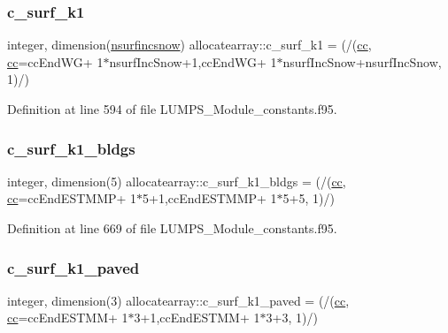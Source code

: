 \subsubsection{\texorpdfstring{c\+\_\+surf\+\_\+k1}{c\_surf\_k1}}
{\footnotesize\ttfamily integer, dimension(\hyperlink{namespaceallocatearray_af4d113f332b6759cfa22271140c9162d}{nsurfincsnow}) allocatearray\+::c\+\_\+surf\+\_\+k1 = (/(\hyperlink{namespaceallocatearray_ac863c81704eb507dee10f5e10741e10c}{cc}, \hyperlink{namespaceallocatearray_ac863c81704eb507dee10f5e10741e10c}{cc}=cc\+End\+WG+ 1$\ast$nsurf\+Inc\+Snow+1,cc\+End\+WG+ 1$\ast$nsurf\+Inc\+Snow+nsurf\+Inc\+Snow, 1)/)}



Definition at line 594 of file L\+U\+M\+P\+S\+\_\+\+Module\+\_\+constants.\+f95.

\mbox{\label{namespaceallocatearray_a24292d640a153248dd27a9d46e279457}} 
\subsubsection{\texorpdfstring{c\+\_\+surf\+\_\+k1\+\_\+bldgs}{c\_surf\_k1\_bldgs}}
{\footnotesize\ttfamily integer, dimension(5) allocatearray\+::c\+\_\+surf\+\_\+k1\+\_\+bldgs = (/(\hyperlink{namespaceallocatearray_ac863c81704eb507dee10f5e10741e10c}{cc}, \hyperlink{namespaceallocatearray_ac863c81704eb507dee10f5e10741e10c}{cc}=cc\+End\+E\+S\+T\+M\+MP+ 1$\ast$5+1,cc\+End\+E\+S\+T\+M\+MP+ 1$\ast$5+5, 1)/)}



Definition at line 669 of file L\+U\+M\+P\+S\+\_\+\+Module\+\_\+constants.\+f95.

\mbox{\label{namespaceallocatearray_a70f82bab4ca451d3736e29ea97681c8e}} 
\subsubsection{\texorpdfstring{c\+\_\+surf\+\_\+k1\+\_\+paved}{c\_surf\_k1\_paved}}
{\footnotesize\ttfamily integer, dimension(3) allocatearray\+::c\+\_\+surf\+\_\+k1\+\_\+paved = (/(\hyperlink{namespaceallocatearray_ac863c81704eb507dee10f5e10741e10c}{cc}, \hyperlink{namespaceallocatearray_ac863c81704eb507dee10f5e10741e10c}{cc}=cc\+End\+E\+S\+T\+MM+ 1$\ast$3+1,cc\+End\+E\+S\+T\+MM+ 1$\ast$3+3, 1)/)}



